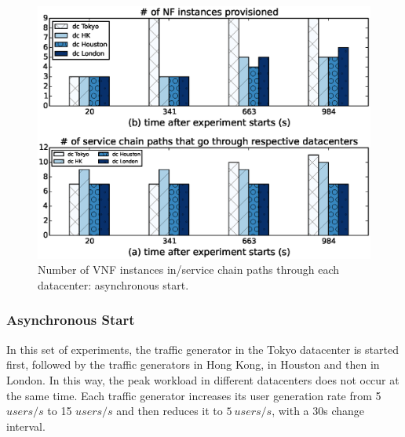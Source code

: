 \begin{figure}[!t]
        \centering
        \includegraphics[width=1\columnwidth]{chap-scalims/figure/nonsyn-reason.eps}
        \caption{%
		 Number of VNF instances in/service chain paths through each datacenter: asynchronous start.}
        \label{fig:nonsyn-scpath}
        \vspace{-5mm}
\end{figure}



\subsubsection{Asynchronous Start}


In this set of experiments, %
the traffic generator in the Tokyo datacenter is started first, followed by the traffic generators in Hong Kong, in Houston and then in London. %
 In this way, the peak workload in different datacenters does not occur at the same time. Each traffic generator increases its user generation rate from 5 $users/s$ to 15 $users/s$ and then reduces it to $5~users/s$, with a 30s change interval.

